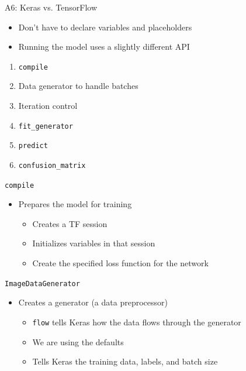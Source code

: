 \documentclass[aspectratio=169]{beamer}
\begin{document}
\begin{frame}[fragile]{A6: Keras vs. TensorFlow}

\begin{itemize}
\item Don't have to declare variables and placeholders
\item Running the model uses a slightly different API
\end{itemize}
\begin{enumerate}
\item \texttt{compile} 
\item Data generator to handle batches
\item Iteration control
\item \texttt{fit\_generator}
\item \texttt{predict}
\item \texttt{confusion\_matrix}
\end{enumerate}
\end{frame}
\begin{frame}[fragile]{\texttt{compile}}

\begin{itemize}
\item Prepares the model for training 
\begin{itemize}
\item Creates a TF session
\item Initializes variables in that session
\item Create the specified loss function for the network 
\end{itemize}
\end{itemize}
\end{frame}
\begin{frame}[fragile]{\texttt{ImageDataGenerator}}

\begin{itemize}
\item Creates a generator (a data preprocessor)
\begin{itemize}
\item \texttt{flow} tells Keras how the data flows through the generator
\item We are using the defaults
\item Tells Keras the training data, labels, and batch size
\end{itemize}
\end{itemize}
\end{frame}
\end{document}
